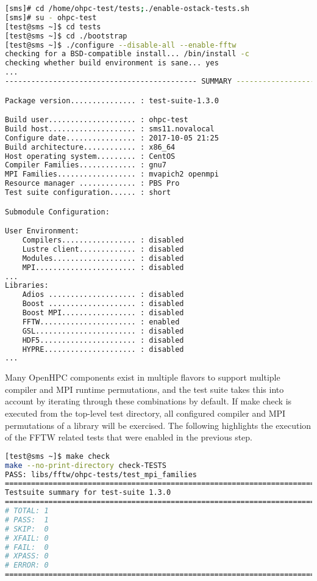 \begin{lstlisting}[language=bash,keywords={},upquote=true]
[sms]# cd /home/ohpc-test/tests;./enable-ostack-tests.sh 
[sms]# su - ohpc-test
[test@sms ~]$ cd tests 
[test@sms ~]$ cd ./bootstrap
[test@sms ~]$ ./configure --disable-all --enable-fftw 
checking for a BSD-compatible install... /bin/install -c
checking whether build environment is sane... yes
... 
-------------------------------------------- SUMMARY ---------------------------------------------

Package version............... : test-suite-1.3.0

Build user.................... : ohpc-test
Build host.................... : sms11.novalocal
Configure date................ : 2017-10-05 21:25
Build architecture............ : x86_64
Host operating system......... : CentOS
Compiler Families............. : gnu7
MPI Families.................. : mvapich2 openmpi
Resource manager ............. : PBS Pro
Test suite configuration...... : short

Submodule Configuration:

User Environment:
    Compilers................. : disabled
    Lustre client............. : disabled
    Modules................... : disabled
    MPI....................... : disabled
...
Libraries:
    Adios .................... : disabled
    Boost .................... : disabled
    Boost MPI................. : disabled
    FFTW...................... : enabled
    GSL....................... : disabled
    HDF5...................... : disabled
    HYPRE..................... : disabled
...
\end{lstlisting}
	
Many OpenHPC components exist in multiple flavors to support multiple compiler and MPI runtime permutations, and the test suite takes this into account by iterating through these combinations by default.
If make check is executed from the top-level test directory, all configured compiler and MPI permutations of a library will be exercised. The following highlights the execution of the FFTW related tests that were enabled in the previous step.

\begin{lstlisting}[language=bash,keywords={},upquote=true]
[test@sms ~]$ make check 
make --no-print-directory check-TESTS
PASS: libs/fftw/ohpc-tests/test_mpi_families
============================================================================
Testsuite summary for test-suite 1.3.0
============================================================================
# TOTAL: 1
# PASS:  1
# SKIP:  0
# XFAIL: 0
# FAIL:  0
# XPASS: 0
# ERROR: 0
============================================================================
\end{lstlisting}
